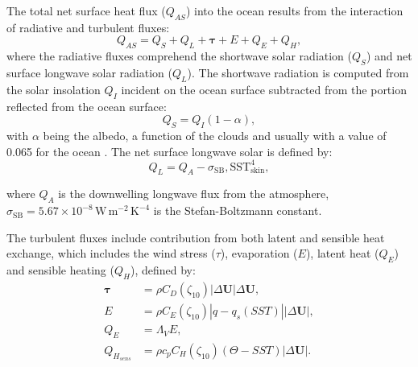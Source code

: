 The total net surface heat flux ($Q_{AS}$) into the ocean results from the interaction of radiative and turbulent fluxes:
\begin{equation}
    Q_{AS} = Q_{S} + Q_{L} +  \boldsymbol{\tau} + E + Q_{E} + Q_{H},
\end{equation}
where the radiative fluxes comprehend the shortwave solar radiation ($Q_{S}$) and net surface longwave solar radiation ($Q_{L}$). The shortwave radiation is computed from the solar insolation $Q_{I}$ incident on the ocean surface subtracted from the portion reflected from the ocean surface:
\begin{equation}
    Q_{S} = Q_{I}(1 - \alpha),
\end{equation}
with $\alpha$ being the albedo, a function of the clouds and usually with a value of 0.065 for the ocean \citep{Payne1972}. The net surface longwave solar is defined by:
\begin{equation}
    Q_{L} = Q_{A} - \sigma_{\text{SB}} , \mathrm{SST}_{\text{skin}}^{4},
\end{equation}

where $Q_{A}$ is the downwelling longwave flux from the atmosphere, $\sigma_{\text{SB}} = 5.67\times10^{-8}\,\text{W}\,\text{m}^{-2}\,\text{K}^{-4}$ is the Stefan-Boltzmann constant.

The turbulent fluxes include contribution from both latent and sensible heat exchange, which includes the wind stress ($\tau$), %
evaporation ($E$), latent heat ($Q_{E}$) and sensible heating ($Q_{H}$), defined by:
\begin{align}
    \boldsymbol{\tau} &= \rho C_{D} \left( \zeta_{10} \right) |\Delta \boldsymbol{U}| \Delta \boldsymbol{U}, \\
    E &= \rho C_{E} \left( \zeta_{10} \right) | q - q_{s} \left( SST \right)| |\Delta \boldsymbol{U}|, \\
    Q_{E} &= \Lambda_{V} E, \\
    Q_{H_{sens}} &= \rho c_{p} C_{H} \left( \zeta_{10} \right) \left( \Theta - SST \right) |\Delta \boldsymbol{U}|.
\end{align}

